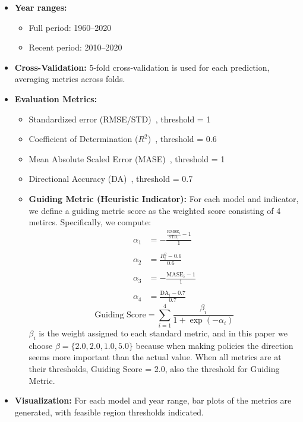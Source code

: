 \documentclass[12pt]{article}
\begin{document}
\begin{itemize}
    \item \textbf{Year ranges:}
    \begin{itemize}
        \item Full period: 1960--2020
        \item Recent period: 2010--2020
    \end{itemize}
    \item \textbf{Cross-Validation:} 5-fold cross-validation is used for each prediction, averaging metrics across folds.
    \item \textbf{Evaluation Metrics:}
    \begin{itemize}
        \item Standardized error (RMSE/STD)~\cite{ChaiDraxler2014}, threshold = 1
        \item Coefficient of Determination ($R^2$)~\cite{Alexander2001}, threshold = 0.6
        \item Mean Absolute Scaled Error (MASE)~\cite{Hyndman2006}, threshold = 1
        \item Directional Accuracy (DA)~\cite{Hyndman2006}, threshold = 0.7
        \item \textbf{Guiding Metric (Heuristic Indicator):} For each model and indicator, we define a guiding metric score as the weighted score consisting of 4 metircs. Specifically, we compute:
        \begin{align*}
        \alpha_1 &= -\frac{\frac{\text{RMSE}_i}{\text{STD}_i} - 1}{1} \\\\
        \alpha_2 &= \frac{R_i^2 - 0.6}{0.6} \\\\
        \alpha_3 &= -\frac{\text{MASE}_i - 1}{1} \\\\
        \alpha_4 &= \frac{\text{DA}_i - 0.7}{0.7}
        \end{align*}
        \[
        \text{Guiding Score} = \sum_{i=1}^4 \frac{\beta_i}{1 + \exp(-\alpha_i)}
        \]
        $\beta_i$ is the weight assigned to each standard metric, and in this paper we choose $\beta = \{2.0, 2.0, 1.0, 5.0\}$ because when making policies the direction seems more important than the actual value. When all metrics are at their thresholds, Guiding Score = 2.0, also the threshold for Guiding Metric.
    \end{itemize}
    \item \textbf{Visualization:} For each model and year range, bar plots of the metrics are generated, with feasible region thresholds indicated.
\end{itemize}
\end{document}

